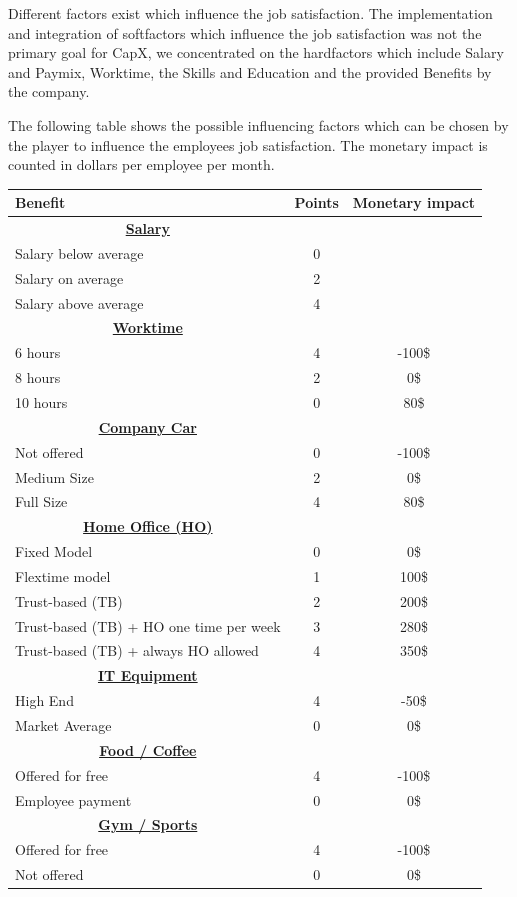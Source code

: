 Different factors exist which influence the job satisfaction. \cite{Kapur} The implementation and integration of softfactors which influence the job satisfaction was not the primary goal for CapX, we concentrated on the hardfactors which include Salary and Paymix, Worktime, the Skills and Education and the provided Benefits by the company. 

The following table shows the possible influencing factors which can be chosen by the player to influence the employees job satisfaction. The monetary impact is counted in dollars per employee per month. 

\begin{table}[]
    \centering
\begin{tabular}{l|c|c}
    \hline
     \textbf{Benefit} & \textbf{Points} & \textbf{Monetary impact} \\
     \hline \hline
     \multicolumn{1}{c|}{\underline{\textbf{Salary}}} & & \\
     Salary below average & 0 &  \\
     Salary on average & 2 &  \\
     Salary above average & 4 &   \\
     \hline
     \multicolumn{1}{c|}{\underline{\textbf{Worktime}}} & & \\
     6 hours & 4 & -100\$  \\
     8 hours & 2 & 0\$  \\
     10 hours & 0 & 80\$  \\
     \hline
     \multicolumn{1}{c|}{\underline{\textbf{Company Car}}} & & \\
     Not offered & 0 & -100\$  \\
     Medium Size & 2 & 0\$  \\
     Full Size & 4 & 80\$  \\
     \hline
     \multicolumn{1}{c|}{\underline{\textbf{Home Office (HO)}}} & & \\
     Fixed Model & 0 & 0\$  \\
     Flextime model & 1 & 100\$  \\
     Trust-based (TB) & 2 & 200\$  \\
     Trust-based (TB) + HO one time per week & 3 & 280\$  \\
     Trust-based (TB) + always HO allowed & 4 & 350\$  \\
     \hline
     \multicolumn{1}{c|}{\underline{\textbf{IT Equipment}}} & & \\
     High End & 4 & -50\$  \\
     Market Average & 0 & 0\$  \\
     \hline
     \multicolumn{1}{c|}{\underline{\textbf{Food / Coffee}}} & & \\
     Offered for free & 4 & -100\$  \\
     Employee payment & 0 & 0\$  \\
     \hline
     \multicolumn{1}{c|}{\underline{\textbf{Gym / Sports}}} & & \\
     Offered for free & 4 & -100\$  \\
     Not offered & 0 & 0\$  \\
     \hline


\end{tabular}
\end{table}

